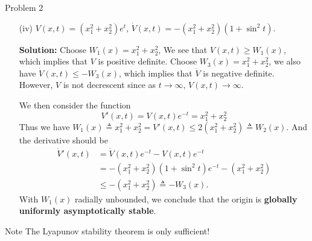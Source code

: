\documentclass[8pt]{beamer}
\begin{document}
\begin{frame}[t]{Problem 2}
  \begin{itemize}
    \item[(iv)] $V(x,t)=(x_1^2+x_2^2)e^t$, $\dot V(x,t)=-(x_1^2+x_2^2)(1+\sin^2t)$.
    
    {\bf Solution:} Choose $W_1(x)=x_1^2+x_2^2$, We see that $V(x,t)\ge W_1(x)$, which implies that $V$ is positive definite.
    Choose $W_3(x)=x_1^2+x_2^2$, we also have $\dot V(x,t)\le -W_3(x)$, which implies that $\dot V$ is negative definite.
    However, $V$ is not decrescent since as $t\to\infty$, $V(x,t)\to\infty$. 
    
    We then consider the function \[V'(x,t)=V(x,t)e^{-t}=x_1^2+x_2^2\]
    Thus we have $W_1(x)\triangleq x_1^2+x_2^2=V'(x,t)\le 2(x_1^2+x_2^2)\triangleq W_2(x)$. And the derivative should be 
    \begin{align*}
        \dot V'(x,t)&=\dot V(x,t)e^{-t}-V(x,t)e^{-t}\\
        &=-(x_1^2+x_2^2)(1+\sin^2t)e^{-t}-(x_1^2+x_2^2)\\
        &\le -(x_1^2+x_2^2)\triangleq -W_3(x).
    \end{align*}
    With $W_1(x)$ radially unbounded, we conclude that the origin is \textbf{globally uniformly asymptotically stable}.
  \end{itemize}
  \begin{block}{Note}
    The Lyapunov stability theorem is only sufficient!
  \end{block}
\end{frame}
\end{document}
